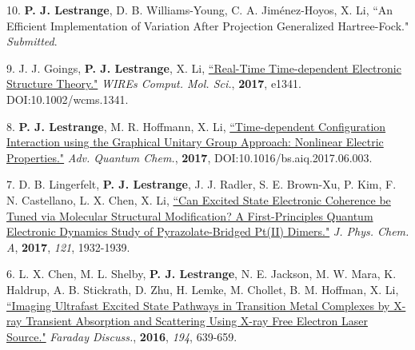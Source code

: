 


\begin{cvpublications}


\cvpublication
{10.} 
{\textbf{P. J. Lestrange}, D. B. Williams-Young, C. A. Jim\'enez-Hoyos, X. Li, ``An Efficient Implementation of Variation After Projection Generalized Hartree-Fock." \textit{Submitted}.} 


\cvpublication
{9.} 
{J. J. Goings, \textbf{P. J. Lestrange}, X. Li, \href{http://onlinelibrary.wiley.com/doi/10.1002/wcms.1341/abstract}{``Real-Time Time-dependent Electronic Structure Theory."} \textit{WIREs Comput. Mol. Sci.}, \textbf{2017}, e1341. DOI:10.1002/wcms.1341.}


\cvpublication
{8.} 
{\textbf{P. J. Lestrange}, M. R. Hoffmann, X. Li, \href{http://www.sciencedirect.com/science/article/pii/S0065327617300618}{``Time-dependent Configuration Interaction using the Graphical Unitary Group Approach: Nonlinear Electric Properties."} \textit{Adv. Quantum Chem.}, \textbf{2017}, DOI:10.1016/bs.aiq.2017.06.003.} 


\cvpublication
{7.} 
{D. B. Lingerfelt, \textbf{P. J. Lestrange}, J. J. Radler, S. E. Brown-Xu, P. Kim, F. N. Castellano, L. X. Chen, X. Li, \href{http://pubs.acs.org/doi/abs/10.1021/acs.jpca.6b12099}{``Can Excited State Electronic Coherence be Tuned via Molecular Structural Modification? A First-Principles Quantum Electronic Dynamics Study of Pyrazolate-Bridged Pt(II) Dimers."} \textit{J. Phys. Chem. A}, \textbf{2017}, \textit{121}, 1932-1939.} 


\cvpublication
{6.} 
{L. X. Chen, M. L. Shelby, \textbf{P. J. Lestrange}, N. E. Jackson, M. W. Mara, K. Haldrup, A. B. Stickrath, D. Zhu, H. Lemke, M. Chollet, B. M. Hoffman, X. Li,  \href{http://pubs.rsc.org/en/Content/ArticleLanding/2016/FD/C6FD00083E}{``Imaging Ultrafast Excited State Pathways in Transition Metal Complexes by X-ray Transient Absorption and Scattering Using X-ray Free Electron Laser Source."} \textit{Faraday Discuss.}, \textbf{2016}, \textit{194}, 639-659.} 


\end{cvpublications}

